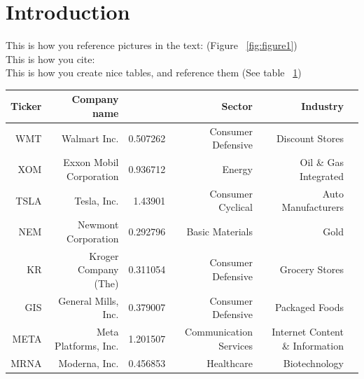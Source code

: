 
\section{Introduction}

This is how you reference pictures in the text: (Figure ~\ref{fig:figure1}) \\
This is how you cite: \cite[Some page, some paraghaph]{hawking1988} \\
This is how you create nice tables, and reference them (See table ~\ref{table:tab1})

\begin{table}[ht]
    \label{table:tab1}
    \begin{tabular}{@{}rrrrrr@{}}
    \toprule
    \textbf{Ticker} & \textbf{Company name}      & \boldmath{$\beta$} & \textbf{Sector}        & \textbf{Industry}  \\ 
    \midrule
    WMT       & Walmart Inc.            & 0.507262      & Consumer Defensive     & Discount Stores                  \\
    XOM       & Exxon Mobil Corporation & 0.936712      & Energy                 & Oil \& Gas Integrated               \\
    TSLA      & Tesla, Inc.             & 1.43901       & Consumer Cyclical      & Auto Manufacturers                \\
    NEM       & Newmont Corporation     & 0.292796      & Basic Materials        & Gold                                \\
    KR        & Kroger Company (The)    & 0.311054      & Consumer Defensive     & Grocery Stores                      \\
    GIS       & General Mills, Inc.     & 0.379007      & Consumer Defensive     & Packaged Foods                       \\
    META      & Meta Platforms, Inc.    & 1.201507      & Communication Services & Internet Content \& Information     \\
    MRNA      & Moderna, Inc.           & 0.456853      & Healthcare             & Biotechnology                     \\ 
    \bottomrule
    \end{tabular}
\end{table}

